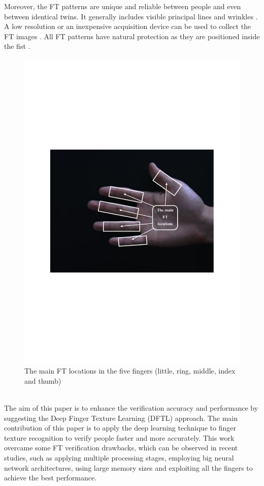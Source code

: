 \documentclass[conference]{IEEEtran}
\begin{document}
Moreover, the FT patterns are unique and reliable between people and even between identical twins. It generally includes visible principal lines and wrinkles \cite{Bhaskar2014Hand}. A low resolution or an inexpensive acquisition device can be used to collect the FT images \cite{Michael2010Robust}. All FT patterns have natural protection as they are positioned inside the fist \cite{Al-Nima2015Human}. 
\begin{figure}[!h]
    \centering
    \includegraphics[page=1,scale=.5,trim=3cm 9cm 3cm 9cm,clip]{FT_locations_patterns.pdf}
    \caption{The main FT locations in the five fingers (little, ring, middle, index and thumb)}
    \label{fig:FT_locations}
\end{figure}\\
The aim of this paper is to enhance the verification accuracy and performance by suggesting the Deep Finger Texture Learning (DFTL) approach. The main contribution of this paper is to apply the deep learning technique to finger texture recognition to verify people faster and more accurately. This work overcame some FT verification drawbacks, which can be observed in recent studies, such as applying multiple processing stages, employing big neural network architectures, using large memory sizes and exploiting all the fingers to achieve the best performance.
\end{document}
